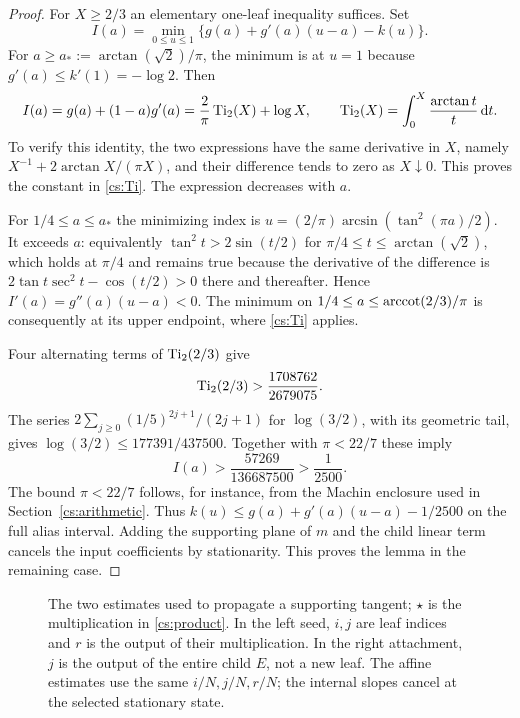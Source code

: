 \begin{proof}
For $X\ge2/3$ an elementary one-leaf inequality suffices. Set
\[
 I(a)=\min_{0\le u\le1}\{g(a)+g'(a)(u-a)-k(u)\}.
\]
For $a\ge a_*:=\arctan(\sqrt2)/\pi$, the minimum is at $u=1$ because $g'(a)\le k'(1)=-\log2$. Then
\begin{equation}\label{cs:Ti}
 I(a)=g(a)+(1-a)g'(a)
 =\frac2\pi\operatorname{Ti}_2(X)+\log X,\qquad
 \operatorname{Ti}_2(X)=\int_0^X\frac{\arctan t}{t}\,\mathrm d t.
\end{equation}
To verify this identity, the two expressions have the same derivative in $X$, namely
$X^{-1}+2\arctan X/(\pi X)$, and their difference tends to zero as $X\downarrow0$. This proves the constant in \eqref{cs:Ti}. The expression decreases with $a$.

For $1/4\le a\le a_*$ the minimizing index is
$u=(2/\pi)\arcsin(\tan^2(\pi a)/2)$. It exceeds $a$: equivalently
$\tan^2 t>2\sin(t/2)$ for $\pi/4\le t\le\arctan(\sqrt2)$, which holds at $\pi/4$ and remains true because the derivative of the difference is $2\tan t\sec^2t-\cos(t/2)>0$ there and thereafter. Hence $I'(a)=g''(a)(u-a)<0$. The minimum on $1/4\le a\le\operatorname{arccot}(2/3)/\pi$ is consequently at its upper endpoint, where \eqref{cs:Ti} applies.

Four alternating terms of $\operatorname{Ti}_2(2/3)$ give
\[
 \operatorname{Ti}_2(2/3)>\frac{1708762}{2679075}.
\]
The series $2\sum_{j\ge0}(1/5)^{2j+1}/(2j+1)$ for $\log(3/2)$, with its geometric tail, gives
$\log(3/2)\le177391/437500$. Together with $\pi<22/7$ these imply
\begin{equation}\label{cs:elementary-margin}
 I(a)>\frac{57269}{136687500}>\frac1{2500}.
\end{equation}
The bound $\pi<22/7$ follows, for instance, from the Machin enclosure used in Section~\ref{cs:arithmetic}. Thus
$k(u)\le g(a)+g'(a)(u-a)-1/2500$ on the full alias interval. Adding the supporting plane of $m$ and the child linear term cancels the input coefficients by stationarity. This proves the lemma in the remaining case.
\end{proof}

\begin{figure}[t]
\centering
\caption{The two estimates used to propagate a supporting tangent; $\star$ is the multiplication in \eqref{cs:product}. In the left seed, $i,j$ are leaf indices and $r$ is the output of their multiplication. In the right attachment, $j$ is the output of the entire child $E$, not a new leaf. The affine estimates use the same $i/N,j/N,r/N$; the internal slopes cancel at the selected stationary state.}
\label{cs:figure}
\end{figure}
